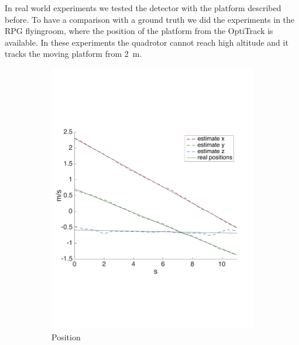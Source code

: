In real world experiments we tested the detector with the platform described before. To have a comparison with a ground truth we did the experiments in the RPG flyingroom, where the position of the platform from the OptiTrack is available. In these experiments the quadrotor cannot reach high altitude and it tracks the moving platform from \SI{2}{\meter}.
\begin{figure}[!htbp]
  \centering
   \begin{subfigure}[b]{0.45\textwidth}
        \includegraphics[width=\textwidth]{img/tag_moving_real_world_pos_high_altitude.pdf}
        \caption{Position }
        \label{fig:one_ekf_real_world_high}
   \end{subfigure}\hfill
   \begin{subfigure}[b]{0.45\textwidth}

\end{subfigure}
\end{figure}
